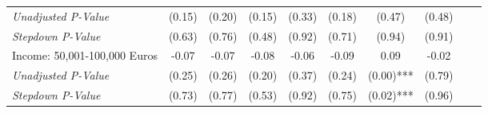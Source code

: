 \begin{tabular}{l c c c c c c c c c}
\quad \textit{Unadjusted P-Value} & (0.15) & (0.20) & (0.15) & (0.33) & (0.18) & (0.47) & (0.48) \\
\quad \textit{Stepdown P-Value} & (0.63) & (0.76) & (0.48) & (0.92) & (0.71) & (0.94) & (0.91) \\
Income: 50,001-100,000 Euros & -0.07 & -0.07 & -0.08 & -0.06 & -0.09 & 0.09 & -0.02 \\
\quad \textit{Unadjusted P-Value} & (0.25) & (0.26) & (0.20) & (0.37) & (0.24) & (0.00)*** & (0.79) \\
\quad \textit{Stepdown P-Value} & (0.73) & (0.77) & (0.53) & (0.92) & (0.75) & (0.02)*** & (0.96) \\
\bottomrule
\end{tabular}

